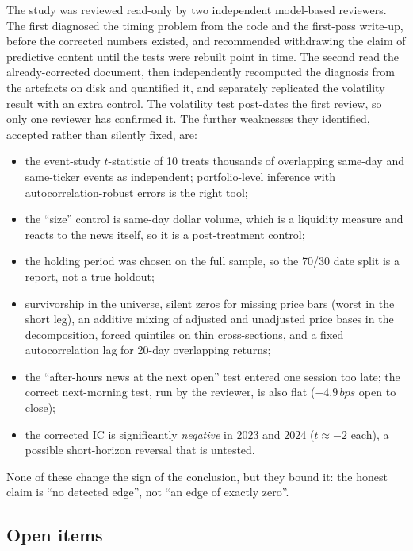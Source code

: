 \documentclass[11pt,letterpaper]{article}
\newcommand{\bps}{\,bps}
\begin{document}
The study was reviewed read-only by two independent model-based reviewers. The first diagnosed
the timing problem from the code and the first-pass write-up, before the corrected numbers
existed, and recommended withdrawing the claim of predictive content until the tests were
rebuilt point in time. The second read the already-corrected document, then independently
recomputed the diagnosis from the artefacts on disk and quantified it, and separately replicated
the volatility result with an extra control. The volatility test post-dates the first review, so
only one reviewer has confirmed it. The further weaknesses they identified, accepted rather than
silently fixed, are:
\begin{itemize}
  \item the event-study $t$-statistic of 10 treats thousands of overlapping same-day and same-ticker
        events as independent; portfolio-level inference with autocorrelation-robust errors is the
        right tool;
  \item the ``size'' control is same-day dollar volume, which is a liquidity measure and reacts to
        the news itself, so it is a post-treatment control;
  \item the holding period was chosen on the full sample, so the 70/30 date split is a report, not
        a true holdout;
  \item survivorship in the universe, silent zeros for missing price bars (worst in the short leg),
        an additive mixing of adjusted and unadjusted price bases in the decomposition, forced
        quintiles on thin cross-sections, and a fixed autocorrelation lag for 20-day overlapping
        returns;
  \item the ``after-hours news at the next open'' test entered one session too late; the correct
        next-morning test, run by the reviewer, is also flat ($-4.9\bps$ open to close);
  \item the corrected IC is significantly \emph{negative} in 2023 and 2024 ($t\approx-2$ each), a
        possible short-horizon reversal that is untested.
\end{itemize}
None of these change the sign of the conclusion, but they bound it: the honest claim is ``no
detected edge'', not ``an edge of exactly zero''.

\subsection{Open items}
\label{sec:open}
\end{document}
